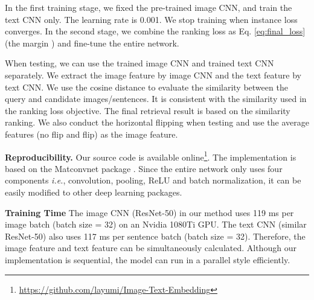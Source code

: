 \documentclass[10pt,final,journal]{IEEEtran}
\newcommand{\ie}{\mbox{\emph{i.e.}}}
\begin{document}
In the first training stage, we fixed the pre-trained image CNN, and train the text CNN only. The learning rate is 0.001. We stop training when instance loss converges. In the second stage, we combine the ranking loss as Eq. \ref{eq:final_loss} (the margin ) and fine-tune the entire network. 

When testing, we can use the trained image CNN and trained text CNN separately. We extract the image feature  by image CNN and the text feature  by text CNN. We use the cosine distance to evaluate the similarity between the query and candidate images/sentences. It is consistent with the similarity used in the ranking loss objective. The final retrieval result is based on the similarity ranking. We also conduct the horizontal flipping when testing and use the average features (no flip and flip) as the image feature. 

\textbf{Reproducibility.} Our source code is available online\footnote{\url{https://github.com/layumi/Image-Text-Embedding}}. The implementation is based on the Matconvnet package \cite{vedaldi15matconvnet}. Since the entire network only uses four components \ie, convolution, pooling, ReLU and batch normalization, it can be easily modified to other deep learning packages. 

\textbf{Training Time} The image CNN (ResNet-50) in our method uses 119 ms per image batch (batch size = 32) on an Nvidia 1080Ti GPU. The text CNN (similar ResNet-50) also uses 117 ms per sentence batch (batch size = 32). Therefore, the image feature and text feature can be simultaneously calculated. Although our implementation is sequential, the model can run in a parallel style efficiently.
\end{document}
